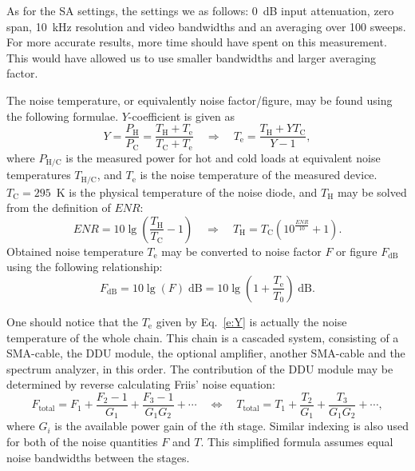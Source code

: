 \documentclass[a4paper, 12pt]{article}
\begin{document}
As for the SA settings, the settings we as follows: 0~dB input attenuation, zero span, 
10~kHz resolution and video bandwidths and an averaging over 100 sweeps. For more accurate 
results, more time should have spent on this measurement. This would have allowed us to use 
smaller bandwidths and larger averaging factor.

The noise temperature, or equivalently noise factor/figure, may be found using the following
formulae. $Y$-coefficient is given as
\begin{equation}\label{e:Y}
Y = \frac{P_\mathrm{H}}{P_\mathrm{C}} 
	= \frac{T_\mathrm{H} + T_\mathrm{e}}{T_\mathrm{C} + T_\mathrm{e}}
	\quad\Rightarrow\quad
	T_\mathrm{e} = \frac{T_\mathrm{H} + YT_\mathrm{C}}{Y - 1},
\end{equation}
where $P_\mathrm{H/C}$ is the measured power for hot and cold loads at equivalent noise 
temperatures $T_\mathrm{H/C}$, and $T_\mathrm{e}$ is the noise temperature of the measured 
device. $T_\mathrm{C} = 295$~K is the physical temperature of the noise diode, and 
$T_\mathrm{H}$ may be solved from the definition of $\textit{ENR}$:
\begin{equation}
\mathit{ENR} = 10 \lg \left( \frac{T_\mathrm{H}}{T_\mathrm{C}} - 1 \right) 
	\quad\Rightarrow\quad
	T_\mathrm{H} = T_\mathrm{C} \left( 10^\frac{\mathit{ENR}}{10} + 1 \right).
\end{equation}
Obtained noise temperature $T_\mathrm{e}$ may be converted to noise factor $F$ or figure 
$F_\mathrm{dB}$ using the following relationship:
\begin{equation}
F_\mathrm{dB} = 10 \lg \left( F \right) \mathrm{\;dB} =  10 \lg \left( 1 + \frac{T_\mathrm{e}}{T_0} \right) \mathrm{\;dB}.
\end{equation}

One should notice that the $T_\mathrm{e}$ given by Eq.~\ref{e:Y} is actually the noise 
temperature of the whole chain. This chain is a cascaded system, consisting of a SMA-cable, 
the DDU module, the optional amplifier, another SMA-cable and the spectrum analyzer, in 
this order. The contribution of the DDU module may be determined by reverse calculating 
Friis' noise equation:
\begin{equation}
	F_\mathrm{total} = F_1 + \frac{F_2 - 1}{G_1} + \frac{F_3 - 1}{G_1 G_2} + \cdots
	\quad\Leftrightarrow\quad
	T_\mathrm{total} = T_1 + \frac{T_2}{G_1} + \frac{T_3}{G_1 G_2} + \cdots,
\end{equation}
where $G_i$ is the available power gain of the $i$th stage. Similar indexing is also used 
for both of the noise quantities $F$ and $T$. This simplified formula assumes equal noise 
bandwidths between the stages.
\end{document}
